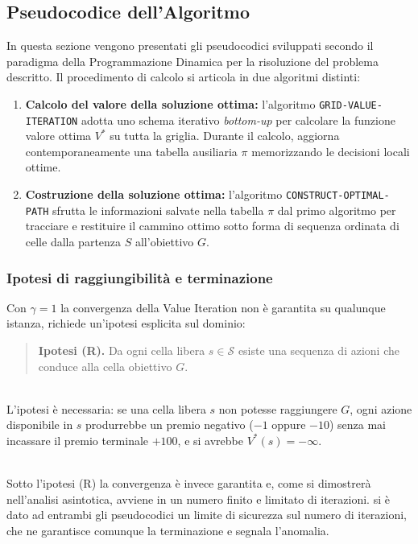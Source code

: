 \clearpage
\subsection{Pseudocodice dell'Algoritmo}
In questa sezione vengono presentati gli pseudocodici sviluppati secondo il paradigma della Programmazione Dinamica per la risoluzione del problema descritto. Il procedimento di calcolo si articola in due algoritmi distinti:

\begin{enumerate}
    \item \textbf{Calcolo del valore della soluzione ottima:} l'algoritmo \texttt{GRID-VALUE-ITERATION} adotta uno schema iterativo \textit{bottom-up} per calcolare la funzione valore ottima $V^*$ su tutta la griglia. Durante il calcolo, aggiorna contemporaneamente una tabella ausiliaria $\pi$ memorizzando le decisioni locali ottime.
    \item \textbf{Costruzione della soluzione ottima:} l'algoritmo \texttt{CONSTRUCT-OPTIMAL-PATH} sfrutta le informazioni salvate nella tabella $\pi$ dal primo algoritmo per tracciare e restituire il cammino ottimo sotto forma di sequenza ordinata di celle dalla partenza $S$ all'obiettivo $G$.
\end{enumerate}

\subsubsection{Ipotesi di raggiungibilità e terminazione}
Con $\gamma = 1$ la convergenza della Value Iteration non è garantita su qualunque istanza, richiede un'ipotesi esplicita sul dominio:

\begin{quote}
	\textbf{Ipotesi (R).} Da ogni cella libera $s \in \mathcal{S}$ esiste una sequenza di azioni che conduce alla cella obiettivo $G$.
\end{quote}

\noindent\\
L'ipotesi è necessaria: se una cella libera $s$ non potesse raggiungere $G$, ogni azione disponibile in $s$ produrrebbe un premio negativo ($-1$ oppure $-10$) senza mai incassare il premio terminale $+100$, e si avrebbe $V^*(s) = -\infty$.

\noindent\\
Sotto l'ipotesi (R) la convergenza è invece garantita e, come si dimostrerà nell'analisi asintotica, avviene in un numero finito e limitato di iterazioni. si è dato ad entrambi gli pseudocodici un limite di sicurezza sul numero di iterazioni, che ne garantisce comunque la terminazione e segnala l'anomalia.

